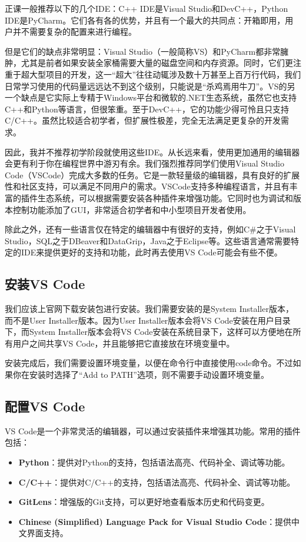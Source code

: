 \documentclass[../main.tex]{subfiles}
\begin{document}
正课一般推荐以下的几个IDE：C++ IDE是Visual Studio和DevC++，Python IDE是PyCharm。它们各有各的优势，并且有一个最大的共同点：开箱即用，用户并不需要复杂的配置来进行编程。

但是它们的缺点非常明显：Visual Studio（一般简称VS）和PyCharm都非常臃肿，尤其是前者如果安装全家桶需要大量的磁盘空间和内存资源。同时，它们更注重于超大型项目的开发，这一“超大”往往动辄涉及数十万甚至上百万行代码，我们日常学习使用的代码量远远达不到这个级别，只能说是“杀鸡焉用牛刀”。VS的另一个缺点是它实际上专精于Windows平台和微软的.NET生态系统，虽然它也支持C++和Python等语言，但很笨重。至于DevC++，它的功能少得可怜且只支持C/C++。虽然比较适合初学者，但扩展性极差，完全无法满足更复杂的开发需求。

因此，我并不推荐初学阶段就使用这些IDE。从长远来看，使用更加通用的编辑器会更有利于你在编程世界中游刃有余。我们强烈推荐同学们使用Visual Studio Code（VSCode）完成大多数的任务。它是一款轻量级的编辑器，具有良好的扩展性和社区支持，可以满足不同用户的需求。VSCode支持多种编程语言，并且有丰富的插件生态系统，可以根据需要安装各种插件来增强功能。它同时也为调试和版本控制功能添加了GUI，非常适合初学者和中小型项目开发者使用。

除此之外，还有一些语言仅在特定的编辑器中有很好的支持，例如C\#之于Visual Studio，SQL之于DBeaver和DataGrip，Java之于Eclipse等。这些语言通常需要特定的IDE来提供更好的支持和功能，此时再去使用VS Code可能会有些不便。

\subsection{安装VS Code}

我们应该上官网下载安装包进行安装。我们需要安装的是System Installer版本，而不是User Installer版本。因为User Installer版本会将VS Code安装在用户目录下，而System Installer版本会将VS Code安装在系统目录下，这样可以方便地在所有用户之间共享VS Code，并且能够把它直接放在环境变量中。

安装完成后，我们需要设置环境变量，以便在命令行中直接使用code命令。不过如果你在安装时选择了“Add to PATH”选项，则不需要手动设置环境变量。

\subsection{配置VS Code}

VS Code是一个非常灵活的编辑器，可以通过安装插件来增强其功能。常用的插件包括：

\begin{itemize}
  \item \textbf{Python}：提供对Python的支持，包括语法高亮、代码补全、调试等功能。
  \item \textbf{C/C++}：提供对C/C++的支持，包括语法高亮、代码补全、调试等功能。
  \item \textbf{GitLens}：增强版的Git支持，可以更好地查看版本历史和代码变更。
  \item \textbf{Chinese (Simplified) Language Pack for Visual Studio Code}：提供中文界面支持。
\end{itemize}
\end{document}

